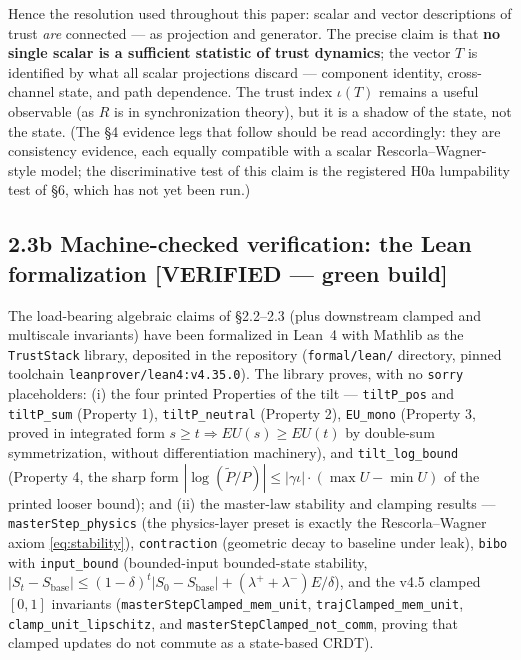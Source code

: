 \documentclass[11pt,twocolumn]{article}
\theoremstyle{gttdef}
\theoremstyle{gttplain}
\begin{document}
Hence the resolution used throughout this paper: scalar and vector descriptions of trust \emph{are} connected --- as projection and generator. The precise claim is that \textbf{no single scalar is a sufficient statistic of trust dynamics}; the vector $T$ is identified by what all scalar projections discard --- component identity, cross-channel state, and path dependence. The trust index $\iota(T)$ remains a useful observable (as $R$ is in synchronization theory), but it is a shadow of the state, not the state. (The \S{}4 evidence legs that follow should be read accordingly: they are consistency evidence, each equally compatible with a scalar Rescorla--Wagner-style model; the discriminative test of this claim is the registered H0a lumpability test of \S{}6, which has not yet been run.)

\subsection*{2.3b Machine-checked verification: the Lean formalization [VERIFIED --- green build]}

The load-bearing algebraic claims of \S{}2.2--2.3 (plus downstream clamped and multiscale invariants) have been formalized in Lean~4
\citep{demoura2021} with Mathlib \citep{mathlib2020} as the \texttt{TrustStack}
library, deposited in the repository (\texttt{formal/lean/} directory,
pinned toolchain \texttt{leanprover/lean4:v4.35.0}). The library proves, with
no \texttt{sorry} placeholders: (i) the four printed Properties of the tilt
--- \texttt{tiltP\_pos} and \texttt{tiltP\_sum} (Property 1),
\texttt{tiltP\_neutral} (Property 2), \texttt{EU\_mono} (Property 3, proved in
integrated form $s \geq t \Rightarrow EU(s) \geq EU(t)$ by double-sum
symmetrization, without differentiation machinery), and
\texttt{tilt\_log\_bound} (Property 4, the sharp form
$|\log(\tilde{P}/P)| \leq |\gamma\iota|\cdot(\max U - \min U)$ of the printed
looser bound); and (ii) the master-law stability and clamping results ---
\texttt{masterStep\_physics} (the physics-layer preset is exactly the
Rescorla--Wagner axiom \eqref{eq:stability}), \texttt{contraction}
(geometric decay to baseline under leak), \texttt{bibo} with
\texttt{input\_bound} (bounded-input bounded-state stability,
$|S_t - S_{\mathrm{base}}| \leq (1-\delta)^t|S_0 - S_{\mathrm{base}}| +
(\lambda^{+}+\lambda^{-})E/\delta$), and the v4.5 clamped $[0,1]$ invariants
(\texttt{masterStepClamped\_mem\_unit}, \texttt{trajClamped\_mem\_unit},
\texttt{clamp\_unit\_lipschitz}, and \texttt{masterStepClamped\_not\_comm},
proving that clamped updates do not commute as a state-based CRDT).
\end{document}
